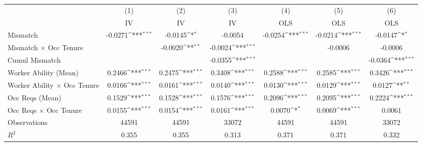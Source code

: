 {
\def\sym#1{\ifmmode^{#1}\else\(^{#1}\)\fi}
\begin{tabular}{l*{6}{c}}
\hline  
                    &\multicolumn{1}{c}{(1)}&\multicolumn{1}{c}{(2)}&\multicolumn{1}{c}{(3)}&\multicolumn{1}{c}{(4)}&\multicolumn{1}{c}{(5)}&\multicolumn{1}{c}{(6)}\\
                    &\multicolumn{1}{c}{IV}&\multicolumn{1}{c}{IV}&\multicolumn{1}{c}{IV}&\multicolumn{1}{c}{OLS}&\multicolumn{1}{c}{OLS}&\multicolumn{1}{c}{OLS}\\
\hline  
Mismatch            &     -0.0271\sym{***}&     -0.0145\sym{*}  &     -0.0054         &     -0.0254\sym{***}&     -0.0214\sym{***}&     -0.0147\sym{*}  \\
[1em]
Mismatch $\times$ Occ Tenure&                     &     -0.0020\sym{**} &     -0.0024\sym{***}&                     &     -0.0006         &     -0.0006         \\
[1em]
Cumul Mismatch      &                     &                     &     -0.0355\sym{***}&                     &                     &     -0.0364\sym{***}\\
[1em]
Worker Ability (Mean)&      0.2466\sym{***}&      0.2475\sym{***}&      0.3408\sym{***}&      0.2588\sym{***}&      0.2585\sym{***}&      0.3426\sym{***}\\
[1em]
Worker Ability $\times$ Occ Tenure&      0.0166\sym{***}&      0.0161\sym{***}&      0.0140\sym{***}&      0.0130\sym{***}&      0.0129\sym{***}&      0.0127\sym{**} \\
[1em]
Occ Reqs (Mean)     &      0.1529\sym{***}&      0.1528\sym{***}&      0.1576\sym{***}&      0.2096\sym{***}&      0.2095\sym{***}&      0.2224\sym{***}\\
[1em]
Occ Reqs $\times$ Occ Tenure&      0.0155\sym{***}&      0.0154\sym{***}&      0.0161\sym{***}&      0.0070\sym{*}  &      0.0069\sym{***}&      0.0061         \\
\hline  
Observations        &       44591         &       44591         &       33072         &       44591         &       44591         &       33072         \\
\(R^{2}\)           &       0.355         &       0.355         &       0.313         &       0.371         &       0.371         &       0.332         \\
\hline  
\end{tabular}
}
